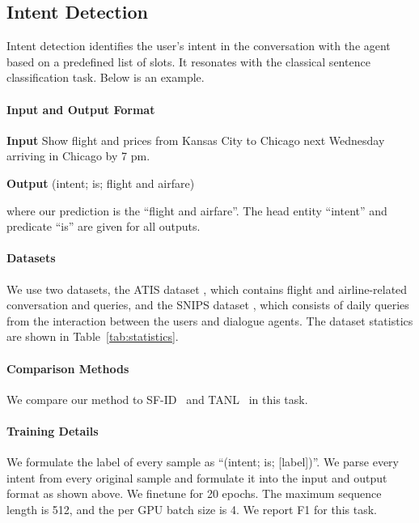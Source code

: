 \subsection{{Intent Detection}}
\label{sec:appendixid}
Intent detection identifies the user's intent in the conversation with the agent based on a predefined list of slots. It resonates with the classical sentence classification task. Below is an example.

\paragraph{Input and Output Format}
\begin{enumerate*}
    \item[] {\bf Input} Show flight and prices from Kansas City to Chicago next Wednesday arriving in Chicago by 7 pm.
    \item[] {\bf Output} (intent; is; flight and airfare)
\end{enumerate*}

\noindent where our prediction is the ``flight and airfare''. The head entity ``intent'' and predicate ``is'' are given for all outputs.

\paragraph{Datasets}
We use two datasets, the ATIS dataset \cite{hemphill1990atis}, which contains flight and airline-related conversation and queries, and the SNIPS dataset \cite{coucke2018snips}, which consists of daily queries from the interaction between the users and dialogue agents.
The dataset statistics are shown in Table~\ref{tab:statistics}.

\paragraph{Comparison Methods}
We compare our method to SF-ID~\cite{haihong2019novel} and TANL~\cite{paolini2021structured} in this task. 

\paragraph{Training Details}
We formulate the label of every sample as ``(intent; is; [label])''. We parse every intent from every original sample and formulate it into the input and output format as shown above. We finetune for 20 epochs. The maximum sequence length is 512, and the per GPU batch size is 4. We report F1 for this task.
            
